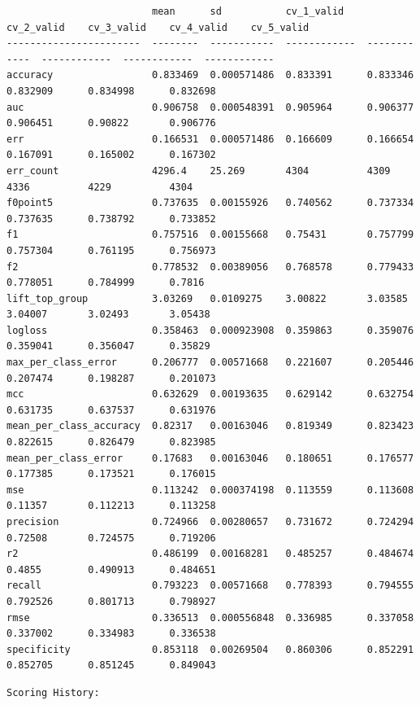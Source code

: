 \documentclass[11pt]{article}
\begin{document}
    
    \begin{verbatim}
                         mean      sd           cv_1_valid    cv_2_valid    cv_3_valid    cv_4_valid    cv_5_valid
-----------------------  --------  -----------  ------------  ------------  ------------  ------------  ------------
accuracy                 0.833469  0.000571486  0.833391      0.833346      0.832909      0.834998      0.832698
auc                      0.906758  0.000548391  0.905964      0.906377      0.906451      0.90822       0.906776
err                      0.166531  0.000571486  0.166609      0.166654      0.167091      0.165002      0.167302
err_count                4296.4    25.269       4304          4309          4336          4229          4304
f0point5                 0.737635  0.00155926   0.740562      0.737334      0.737635      0.738792      0.733852
f1                       0.757516  0.00155668   0.75431       0.757799      0.757304      0.761195      0.756973
f2                       0.778532  0.00389056   0.768578      0.779433      0.778051      0.784999      0.7816
lift_top_group           3.03269   0.0109275    3.00822       3.03585       3.04007       3.02493       3.05438
logloss                  0.358463  0.000923908  0.359863      0.359076      0.359041      0.356047      0.35829
max_per_class_error      0.206777  0.00571668   0.221607      0.205446      0.207474      0.198287      0.201073
mcc                      0.632629  0.00193635   0.629142      0.632754      0.631735      0.637537      0.631976
mean_per_class_accuracy  0.82317   0.00163046   0.819349      0.823423      0.822615      0.826479      0.823985
mean_per_class_error     0.17683   0.00163046   0.180651      0.176577      0.177385      0.173521      0.176015
mse                      0.113242  0.000374198  0.113559      0.113608      0.11357       0.112213      0.113258
precision                0.724966  0.00280657   0.731672      0.724294      0.72508       0.724575      0.719206
r2                       0.486199  0.00168281   0.485257      0.484674      0.4855        0.490913      0.484651
recall                   0.793223  0.00571668   0.778393      0.794555      0.792526      0.801713      0.798927
rmse                     0.336513  0.000556848  0.336985      0.337058      0.337002      0.334983      0.336538
specificity              0.853118  0.00269504   0.860306      0.852291      0.852705      0.851245      0.849043
    \end{verbatim}

    
    \begin{Verbatim}[commandchars=\\\{\}]
Scoring History: 

    \end{Verbatim}
\end{document}
